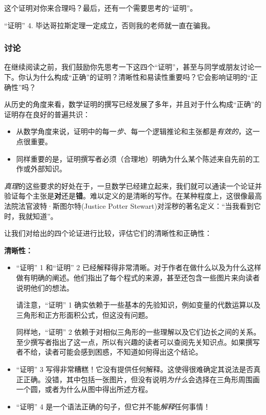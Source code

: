 这个证明对你来合理吗？最后，还有一个需要思考的``证明''。

\begin{proofs}{``证明'' 4.}
    毕达哥拉斯定理一定成立，否则我的老师就一直在骗我。
\end{proofs} 

\subsubsection*{讨论}

在继续阅读之前，我们鼓励你先思考一下这四个``证明''，甚至与同学或朋友讨论一下。你认为什么构成``正确''的证明？清晰性和易读性重要吗？它会影响证明的``正确性''吗？

从历史的角度来看，数学证明的撰写已经发展了多年，并且对于什么构成``正确''的证明存在良好的普遍共识：

\begin{itemize}
    \item 从数学角度来说，证明中的每一\emph{步}、每一个逻辑推论和主张都是\emph{有效的}，这一点很重要。
    \item 同样重要的是，证明撰写者必须（合理地）明确为什么某个陈述来自先前的工作或外部知识。
\end{itemize}

\emph{真理}的这些要求的好处在于，一旦数学已经建立起来，我们就可以通读一个论证并验证每个主张是\textbf{对}还是\textbf{错}。难以定义的是清晰的写作。在某种程度上，这很像最高法院法官波特·斯图尔特(Justice Potter Stewart)对淫秽的著名定义：``当我看到它时，我就知道''。

让我们对给出的四个论证进行比较，评估它们的清晰性和正确性：

\textbf{清晰性：}

\begin{itemize}
    \item ``证明'' 1 和``证明'' 2 已经解释得非常清晰。对于作者在做什么以及为什么这样做有明确的阐述。他们指出了每个程式的来源，甚至还包含一些图片来向读者说明他们的想法。
    
    请注意，``证明'' 1 确实依赖于一些基本的先验知识，例如变量的代数运算以及三角形和正方形面积公式，但这没有问题。

    同样地，``证明'' 2 依赖于对相似三角形的一些理解以及它们边长之间的关系。至少撰写者指出了这一点，所以有兴趣的读者可以查阅先关知识点。如果撰写者不给，读者可能会感到困惑，不知道如何得出这个结论。
    \item ``证明'' 3 写得非常糟糕！它没有提供任何解释。这使得很难确定其说法是否真正正确。没错，其中包括一张图片，但没有说明\emph{为什么}会选择在三角形周围画一个圆，或者为什么从图中得出所述方程。
    \item ``证明'' 4 是一个语法正确的句子，但它并不能\emph{解释}任何事情！
\end{itemize}


